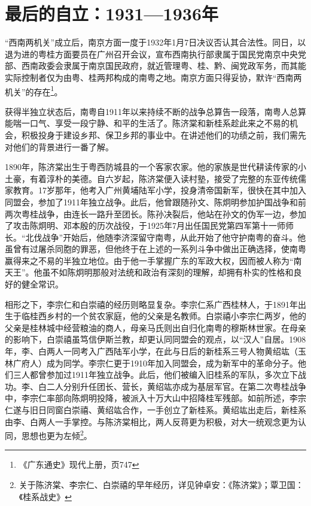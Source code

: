 \section{最后的自立：1931—1936年}


\indent “西南两机关”成立后，南京方面一度于1932年1月7日决议否认其合法性。同日，以退为进的粤桂方面要员在广州召开会议，宣布西南执行部隶属于国民党南京中央党部、西南政委会隶属于南京国民政府，就近管理粤、桂、黔、闽党政军务，而其能实际控制者仅为由粤、桂两邦构成的南粤之地。南京方面只得妥协，默许“西南两机关”的存在\footnote{《广东通史》现代上册，页747}。

获得半独立状态后，南粤自1911年以来持续不断的战争总算告一段落，南粤人总算能喘一口气、享受一段宁静、和平的生活了。陈济棠和新桂系趁此来之不易的机会，积极投身于建设乡邦、保卫乡邦的事业中。在讲述他们的功绩之前，我们需先对他们的背景进行一番了解。

1890年，陈济棠出生于粤西防城县的一个客家农家。他的家族是世代耕读传家的小土豪，有着淳朴的美德。自六岁起，陈济棠便入读村塾，接受了完整的东亚传统儒家教育。17岁那年，他考入广州黄埔陆军小学，投身清帝国新军，很快在其中加入同盟会，参加了1911年独立战争。此后，他曾跟随孙文、陈炯明参加护国战争和前两次粤桂战争，由连长一路升至团长。陈孙决裂后，他站在孙文的伪军一边，参加了攻击陈炯明、邓本殷的历次战役，于1925年7月出任国民党第四军第十一师师长。“北伐战争”开始后，他随李济深留守南粤，从此开始了他守护南粤的奋斗。他虽曾有过屠杀同胞的罪恶，但他终于在上述的一系列斗争中做出正确选择，使南粤赢得来之不易的半独立地位。由于他一手掌握广东的军政大权，因而被人称为“南天王”。他虽不如陈炯明那般对法统和政治有深刻的理解，却拥有朴实的性格和良好的健全常识。

相形之下，李宗仁和白崇禧的经历则略显复杂。李宗仁系广西桂林人，于1891年出生于临桂西乡村的一个贫农家庭，他的父亲是名教师。白崇禧小李宗仁两岁，他的父亲是桂林城中经营粮油的商人，母亲马氏则出自归化南粤的穆斯林世家。在母亲的影响下，白崇禧虽笃信伊斯兰教，却更认同同盟会的观点，以“汉人”自居。1908年，李、白两人一同考入广西陆军小学，在此与日后的新桂系三号人物黄绍竑（玉林广府人）成为同学。李宗仁更于1910年加入同盟会，成为新军中的革命分子。他们三人都曾参加过1911年独立战争。此后，他们被编入旧桂系的军队，多次立下战功。李、白二人分别升任团长、营长，黄绍竑亦成为基层军官。在第二次粤桂战争中，李宗仁率部向陈炯明投降，被派入十万大山中招降桂军残部。如前所述，李宗仁遂与旧日同窗白崇禧、黄绍竑合作，一手创立了新桂系。黄绍竑出走后，新桂系由李、白两人一手掌控。与陈济棠相比，两人反蒋更为积极，对大一统观念更为认同，思想也更为左倾\footnote{关于陈济棠、李宗仁、白崇禧的早年经历，详见钟卓安：《陈济棠》；覃卫国：《桂系战史》}。

